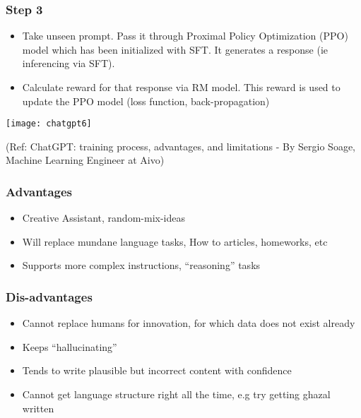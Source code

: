 			
			
			


\begin{frame}[fragile]\frametitle{Step 3}

\begin{itemize}
\item Take unseen prompt. Pass it through Proximal Policy Optimization (PPO) model which has been initialized with SFT. It generates a response (ie inferencing via SFT).
\item Calculate reward for that response via RM model. This reward is used to update the PPO model (loss function, back-propagation)
\end{itemize}	 

			\begin{center}
			\texttt{[image: chatgpt6]}
			
			\end{center}		
			
			{\tiny (Ref: ChatGPT: training process, advantages, and limitations - By Sergio Soage, Machine Learning Engineer at Aivo)}
			
\end{frame}


\begin{frame}[fragile]\frametitle{Advantages}


\begin{itemize}
\item Creative Assistant, random-mix-ideas
\item Will replace mundane language tasks, How to articles, homeworks, etc
\item Supports more complex instructions, ``reasoning'' tasks
\end{itemize}	 

\end{frame}

\begin{frame}[fragile]\frametitle{Dis-advantages}


\begin{itemize}
\item Cannot replace humans for innovation, for which data does not exist already
\item Keeps ``hallucinating''
\item Tends to write plausible but incorrect content with confidence
\item Cannot get language structure right all the time, e.g try getting ghazal written
\end{itemize}	 

\end{frame}

